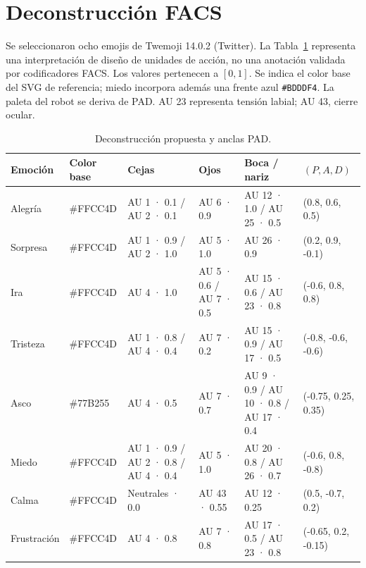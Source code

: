 \documentclass[conference]{IEEEtran}
\begin{document}
\section{Deconstrucción FACS}
Se seleccionaron ocho emojis de Twemoji 14.0.2 (Twitter). La Tabla~\ref{tab:facs} representa una interpretación de diseño de unidades de acción, no una anotación validada por codificadores FACS. Los valores pertenecen a $[0,1]$. Se indica el color base del SVG de referencia; miedo incorpora además una frente azul \texttt{\#BDDDF4}. La paleta del robot se deriva de PAD. AU 23 representa tensión labial; AU 43, cierre ocular.
\begin{table}[t]
\centering\scriptsize
\caption{Deconstrucción propuesta y anclas PAD.}\label{tab:facs}
\begingroup\setlength{\tabcolsep}{3pt}
\begin{tabular}{p{}p{}p{}p{}p{}p{}}\toprule
Emoción & Color base & Cejas & Ojos & Boca / nariz & $(P,A,D)$ \\\midrule
Alegría & \#FFCC4D & AU 1 · 0.1 / AU 2 · 0.1 & AU 6 · 0.9 & AU 12 · 1.0 / AU 25 · 0.5 & (0.8, 0.6, 0.5) \\
Sorpresa & \#FFCC4D & AU 1 · 0.9 / AU 2 · 1.0 & AU 5 · 1.0 & AU 26 · 0.9 & (0.2, 0.9, -0.1) \\
Ira & \#FFCC4D & AU 4 · 1.0 & AU 5 · 0.6 / AU 7 · 0.5 & AU 15 · 0.6 / AU 23 · 0.8 & (-0.6, 0.8, 0.8) \\
Tristeza & \#FFCC4D & AU 1 · 0.8 / AU 4 · 0.4 & AU 7 · 0.2 & AU 15 · 0.9 / AU 17 · 0.5 & (-0.8, -0.6, -0.6) \\
Asco & \#77B255 & AU 4 · 0.5 & AU 7 · 0.7 & AU 9 · 0.9 / AU 10 · 0.8 / AU 17 · 0.4 & (-0.75, 0.25, 0.35) \\
Miedo & \#FFCC4D & AU 1 · 0.9 / AU 2 · 0.8 / AU 4 · 0.4 & AU 5 · 1.0 & AU 20 · 0.8 / AU 26 · 0.7 & (-0.6, 0.8, -0.8) \\
Calma & \#FFCC4D & Neutrales · 0.0 & AU 43 · 0.55 & AU 12 · 0.25 & (0.5, -0.7, 0.2) \\
Frustración & \#FFCC4D & AU 4 · 0.8 & AU 7 · 0.8 & AU 17 · 0.5 / AU 23 · 0.8 & (-0.65, 0.2, -0.15) \\
\bottomrule\end{tabular}\endgroup
\end{table}
\end{document}
